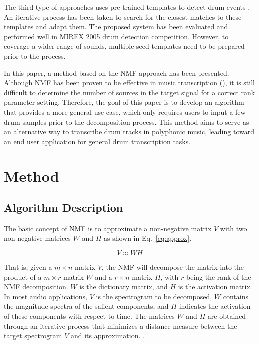 \documentclass{article}
\begin{document}
The third type of approaches uses pre-trained templates to detect drum events \cite{Yoshii2007}. An iterative process has been taken to search for the closest matches to these templates and adapt them. The proposed system has been evaluated and performed well in MIREX 2005 drum detection competition. However, to coverage a wider range of sounds, multiple seed templates need to be prepared prior to the process.

In this paper, a method based on the NMF approach has been presented. Although NMF has been proven to be effective in music transcription (\cite{Smaragdis2003}), it is still difficult to determine the number of sources in the target signal for a correct rank parameter setting. Therefore, the goal of this paper is to develop an algorithm that provides a more general use case, which only requires users to input a few drum samples prior to the decomposition process. This method aims to serve as an alternative way to transcribe drum tracks in polyphonic music, leading toward an end user application for general drum transcription tasks.  
 
\section{Method}\label{sec:method}
\subsection{Algorithm Description}\label{subsec:algorithm description}
The basic concept of NMF is to approximate a non-negative matrix $V$ with two non-negative matrices $W$ and $H$ as shown in Eq.~\eqref{eq:approx}.

\begin{equation}
V \approx WH
\label{eq:approx}
\end{equation}

That is, given a $m \times n$ matrix $V$, the NMF will decompose the matrix into the product of a $m \times r$ matrix $W$ and a $r \times n$ matrix $H$, with $r$ being the rank of the NMF decomposition. $W$ is the dictionary matrix, and $H$ is the activation matrix. In most audio applications, $V$ is the spectrogram to be decomposed, $W$ contains the magnitude spectra of the salient components, and $H$ indicates the activation of these components with respect to time. The matrices $W$ and $H$ are obtained through an iterative process that minimizes a distance measure between the target spectrogram $V$ and its approximation. \cite{Seung2001}. 
\end{document}
